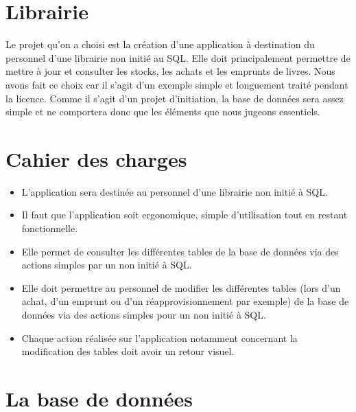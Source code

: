 \documentclass[10pt,a4paper,parskip=full*,DIV=11]{scrartcl}
\begin{document}
\section{Librairie}
Le projet qu’on a choisi est la création d’une application à destination du personnel d’une librairie non initié au SQL. Elle doit principalement permettre de mettre à jour 
et consulter les stocks, les achats et les emprunts de livres. Nous avons fait ce choix car il s’agit d’un exemple simple et 
longuement traité pendant la licence. Comme il s’agit d’un projet d’initiation, la base de données sera assez simple et ne comportera donc que les éléments que nous jugeons essentiels.

\section{Cahier des charges}

\begin{itemize}
    \item L’application sera destinée au personnel d’une librairie non initié à SQL.
    \item Il faut que l'application soit ergonomique, simple d'utilisation tout en restant fonctionnelle.
    \item Elle permet de consulter les différentes tables de la base de données via des actions simples par un non initié à SQL.
    \item Elle doit permettre au personnel de modifier les différentes tables (lors d'un achat, d'un emprunt ou d'un réapprovisionnement par exemple) de la base de données via des actions simples pour un non initié à SQL.
    \item Chaque action réalisée sur l'application notamment concernant la modification des tables doit avoir un retour visuel.
\end{itemize}


\section{La base de données}
\end{document}

